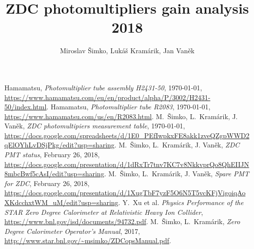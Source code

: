 \documentclass[a4paper,10pt]{article}
\title{ZDC photomultipliers gain analysis 2018}
\author{Miroslav Šimko, Lukáš Kramárik, Jan Vaněk}
\date{}
\begin{document}
\maketitle






\begin{thebibliography}{10}
 Hamamatsu, \textit{Photomultiplier tube assembly H2431-50}, \today, \url{https://www.hamamatsu.com/eu/en/product/alpha/P/3002/H2431-50/index.html}.
 Hamamatsu, \textit{Photomultiplier tube R2083}, \today, \url{https://www.hamamatsu.com/us/en/R2083.html}.
 M.\ Šimko, L.\ Kramárik, J. Vaněk, \textit{ZDC photomultipiers measurement table}, \today,\\ \url{https://docs.google.com/spreadsheets/d/1E0_PEfIwpkxFE8akk1zveQZgpWWD2qElOYhLvDSjPkg/edit?usp=sharing}.
 M.\ Šimko, L.\ Kramárik, J. Vaněk, \textit{ZDC PMT status}, February 26, 2018,
 \url{https://docs.google.com/presentation/d/1dRxTr7tnv7KC7v8NkkvprQo8QhEIIJN8mbcBwf5cAsI/edit?usp=sharing}.
 M.\ Šimko, L.\ Kramárik, J. Vaněk, \textit{Spare PMT for ZDC}, February 26, 2018, \url{https://docs.google.com/presentation/d/1XugTbF7yzF5O6N5T5vcKFjVigoiqAoXKdcchxtWM_uM/edit?usp=sharing}.
 Y.\ Xu et al. \textit{Physics Performance of the STAR Zero Degree Calorimeter at Relativistic Heavy Ion Collider}, \url{https://www.bnl.gov/isd/documents/94732.pdf}.
 M.\ Šimko, L.\ Kramárik, \textit{Zero Degree Calorimeter Operator’s
Manual}, 2017, \url{http://www.star.bnl.gov/~msimko/ZDCopsManual.pdf}.
\end{thebibliography}
\end{document}
